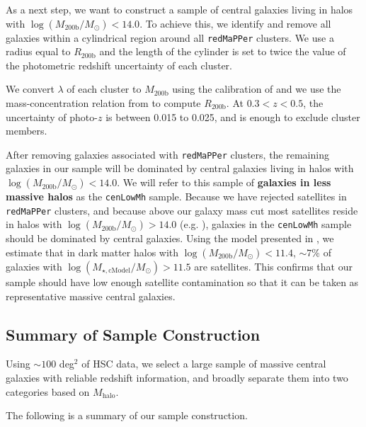 \documentclass[a4paper,fleqn,usenatbib]{mnras}
\def\redm{\texttt{redMaPPer}}
\def\nbcg{\texttt{cenLowMh}}
\def\logmh{{$\log (M_{\mathrm{200b}}/M_{\odot})$}}
\def\logmcmodel{{$\log (M_{\star,\mathrm{cModel}}/M_{\odot})$}}
\begin{document}
    As a next step, we want to construct a sample of central galaxies living in halos 
    with \logmh{}$<14.0$. 
    To achieve this, we identify and remove all galaxies within a cylindrical region 
    around all \redm{} clusters. 
    We use a radius equal to $R_{\mathrm{200b}}$ and the length of the cylinder is 
    set to twice the value of the photometric redshift uncertainty of each cluster.

    We convert $\lambda$ of each cluster to $M_{\mathrm{200b}}$ using the calibration 
    of \citet{Simet2016} and we use the mass-concentration relation from 
    \citet{Diemer2015} to compute $R_{\mathrm{200b}}$. 
    At $0.3 < z < 0.5$, the uncertainty of photo-$z$ is between 0.015 to 0.025, and 
    is enough to exclude cluster members.
    
    After removing galaxies associated with \redm{} clusters, the remaining galaxies 
    in our sample will be dominated by central galaxies living in halos with 
    \logmh{}$< 14.0$. 
    We will refer to this sample of \textbf{galaxies in less massive halos} as the 
    \nbcg{} sample. 
    Because we have rejected satellites in \redm{} clusters, and because above our 
    galaxy mass cut most satellites reside in halos with 
    \logmh$>14.0$ (e.g. \citealt{Reid2014, Hoshino2015, Saito2016, vanUitert2016}), 
    galaxies in the \nbcg{} sample should  be dominated by central galaxies.
    Using the model presented in \citet{Saito2016}, we estimate that in dark matter 
    halos with \logmh$<11.4$, $\sim 7$\% of galaxies with \logmcmodel{}$>11.5$ are 
    satellites.
    This confirms that our sample should have low enough satellite contamination 
    so that it can be taken as representative massive central galaxies.     

\subsection{Summary of Sample Construction}
    \label{ssec:sample}

    Using ${\sim} 100$ deg$^2$ of HSC data, we select a large sample of massive central 
    galaxies with reliable redshift information, and broadly separate them into two 
    categories based on $M_{\mathrm{halo}}$.
    
    The following is a summary of our sample construction. 
        
\end{document}
